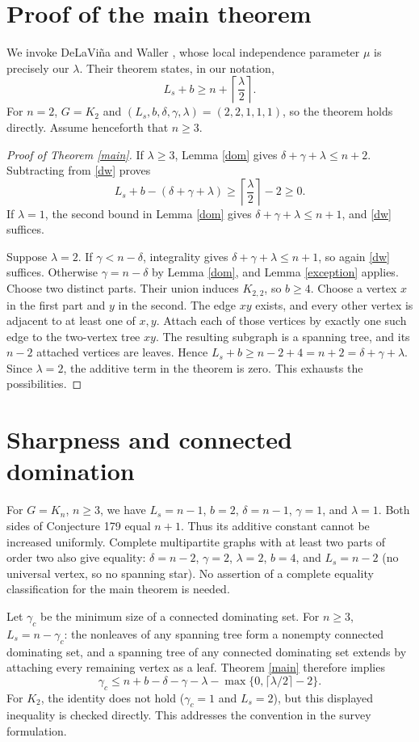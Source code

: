 \documentclass[11pt,a4paper]{article}
\newcommand{\ls}{L_s}
\newcommand{\lam}{\lambda}
\begin{document}
\section{Proof of the main theorem}
We invoke DeLaVi\~na and Waller \cite[Theorem 5]{dw}, whose local independence parameter $\mu$ is precisely our $\lam$. Their theorem states, in our notation,
\begin{equation}\label{dw}
\ls+b\ge n+\left\lceil\frac{\lam}{2}\right\rceil.
\end{equation}
For $n=2$, $G=K_2$ and $(\ls,b,\delta,\gamma,\lam)=(2,2,1,1,1)$, so the theorem holds directly. Assume henceforth that $n\ge3$.
\begin{proof}[Proof of Theorem \ref{main}]
If $\lam\ge3$, Lemma \ref{dom} gives $\delta+\gamma+\lam\le n+2$. Subtracting from \eqref{dw} proves
\[
\ls+b-(\delta+\gamma+\lam)\ge
\left\lceil\frac{\lam}{2}\right\rceil-2\ge0.
\]
If $\lam=1$, the second bound in Lemma \ref{dom} gives $\delta+\gamma+\lam\le n+1$, and \eqref{dw} suffices.

Suppose $\lam=2$. If $\gamma<n-\delta$, integrality gives $\delta+\gamma+\lam\le n+1$, so again \eqref{dw} suffices. Otherwise $\gamma=n-\delta$ by Lemma \ref{dom}, and Lemma \ref{exception} applies. Choose two distinct parts. Their union induces $K_{2,2}$, so $b\ge4$. Choose a vertex $x$ in the first part and $y$ in the second. The edge $xy$ exists, and every other vertex is adjacent to at least one of $x,y$. Attach each of those vertices by exactly one such edge to the two-vertex tree $xy$. The resulting subgraph is a spanning tree, and its $n-2$ attached vertices are leaves. Hence $\ls+b\ge n-2+4=n+2=\delta+\gamma+\lam$. Since $\lam=2$, the additive term in the theorem is zero. This exhausts the possibilities.
\end{proof}

\section{Sharpness and connected domination}
For $G=K_n$, $n\ge3$, we have $\ls=n-1$, $b=2$, $\delta=n-1$, $\gamma=1$, and $\lam=1$. Both sides of Conjecture 179 equal $n+1$. Thus its additive constant cannot be increased uniformly. Complete multipartite graphs with at least two parts of order two also give equality: $\delta=n-2$, $\gamma=2$, $\lam=2$, $b=4$, and $\ls=n-2$ (no universal vertex, so no spanning star). No assertion of a complete equality classification for the main theorem is needed.

Let $\gamma_c$ be the minimum size of a connected dominating set. For $n\ge3$, $\ls=n-\gamma_c$: the nonleaves of any spanning tree form a nonempty connected dominating set, and a spanning tree of any connected dominating set extends by attaching every remaining vertex as a leaf. Theorem \ref{main} therefore implies
\[
\gamma_c\le n+b-\delta-\gamma-\lam
-\max\{0,\lceil\lam/2\rceil-2\}.
\]
For $K_2$, the identity does not hold ($\gamma_c=1$ and $\ls=2$), but this displayed inequality is checked directly. This addresses the convention in the survey formulation.
\end{document}
